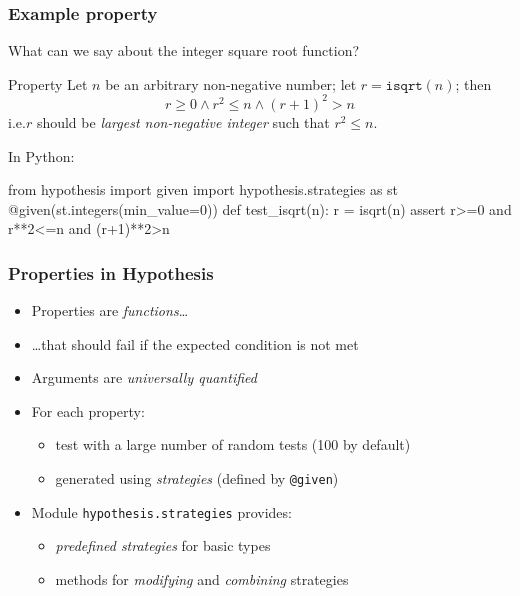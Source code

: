 \documentclass{beamer}
\begin{document}
\begin{frame}[fragile]
  \frametitle{Example property}

  What can we say about the integer square root function?
  \pause
  \medskip

  \begin{block}{Property}
    Let $n$ be an arbitrary non-negative number;
    let $r = \texttt{isqrt}(n)$; then
    \[ r\geq0 \land r^2 \leq n \land (r+1)^2>n  \]
    i.e.\@ $r$ should be \emph{largest non-negative integer} such that
  $r^2 \leq n$.
  \end{block}
  \pause
  \medskip

  In Python:
\begin{semiverbatim}
from hypothesis import given
import hypothesis.strategies as st
@given(\alert<5>{st.integers(min_value=0)})  
def test_isqrt(\alert<4>{n}):                
    r = isqrt(n)
    assert \alert<6>{r>=0 and r**2<=n and (r+1)**2>n}   
  \end{semiverbatim}

  
\end{frame}

\begin{frame}
  \frametitle{Properties in Hypothesis}

  \begin{itemize}
  \item Properties are \emph{functions}\ldots
  \item \ldots that should fail if the expected condition is not met
  \item Arguments are \emph{universally quantified}
  \item For each property:
    \begin{itemize}
  \item test with a large number of random tests (100 by default)
  \item generated using \emph{strategies}
  (defined by \texttt{@given})
    \end{itemize}
  \item Module \texttt{hypothesis.strategies} provides:
    \begin{itemize}
    \item \emph{predefined strategies} for basic types
    \item methods for \emph{modifying} and \emph{combining} strategies
    \end{itemize}
  \end{itemize}
\end{frame}
\end{document}
